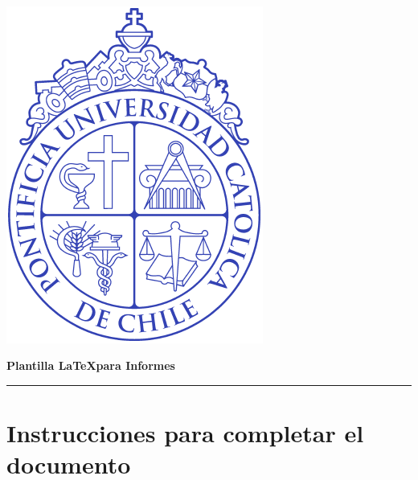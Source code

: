 \documentclass[11pt,letterpaper,twoside]{report}%
\def\doctitle{Plantilla \LaTeX para Informes} %
\def\docsubtitle{} %
\begin{document}
\noindent
%
\mbox{}\\[-0.99\baselineskip]
\setlength{\unitlength}{1mm}
\parbox{30mm}{\includegraphics[scale=0.47]{figs/logo_uc.pdf}\\[-0.55\baselineskip]}
\hspace*{-30mm}
\parbox{\textwidth}{
{\centering
{\LARGE \bf \doctitle}\\
}}
\rule[0ex]{\textwidth}{.4pt}


\thispagestyle{plain}

\def\contentsname{\normalfont \Large Contenidos\vspace*{-1cm}}
\vspace*{-2cm}
\parbox[t]{\textwidth}{
{\tableofcontents}}

\section{Instrucciones para completar el documento}
\end{document}
